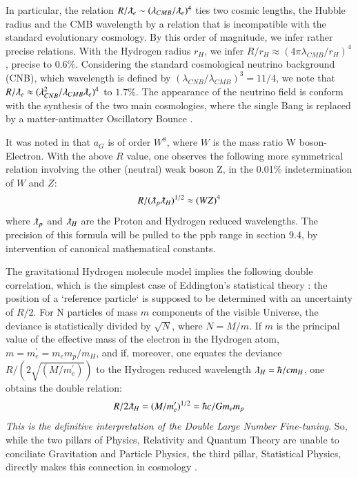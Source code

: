 \documentclass[twoside,draft]{article}
\begin{document}
\begin{sloppypar}
In particular, the relation $R/\lambdabar_{e} \sim (\lambda_{CMB} / \lambdabar_{e})^{4}$ ties two cosmic lengths, the Hubble radius and the CMB wavelength by a relation that is incompatible with the standard evolutionary cosmology. By this order of magnitude, we infer rather precise relations. With the Hydrogen radius $r_H$, we infer 
$ R/r_H \approx (4\pi \lambda_{CMB}/r_H)^{4}$, precise to $0.6\%$. 
Considering the standard cosmological neutrino background (CNB), which wavelength is defined by $(\lambda_{CNB} / \lambda_{CMB})^{3} = 11/4$, we note that $R/ \lambdabar_{e} \approx
( \lambda_{CNB}^{2} / \lambda_{CMB} \lambdabar_{e} )^{4}$ to $1.7\%$. The appearance of the neutrino field is conform with the synthesis of the two main cosmologies, where the single Bang is replaced by a matter-antimatter Oscillatory Bounce \cite{Sanchez2}.

It was noted in \cite{Carr} that $a_{G}$ is of order $W^{8}$, where $W$ is the mass ratio W boson-Electron. With the above $R$ value, one observes the following more symmetrical relation involving the other (neutral) weak boson Z, in the 0.01\% indetermination of $W$ and $Z$:
\begin{equation}
R/(\lambdabar_{p}\lambdabar_{H})^{1/2}\approx (WZ)^4
\end{equation}
where $\lambdabar_{p}$ and $\lambdabar_{H}$ are the Proton and Hydrogen reduced wavelengths. The precision of this formula will be pulled to the ppb range in section 9.4, by intervention of canonical mathematical constants.

The gravitational Hydrogen molecule model \cite{Sanchez1} implies the following double correlation, which is the simplest case of Eddington's statistical theory \cite{Eddington}: the position of a `reference particle` is supposed to be determined 
with an uncertainty of ${R/2}$. 
For N particles of mass $m$ components of the visible Universe, the deviance is statistically divided by $\sqrt{N}$, where $N = M/m$. If $m$ is the principal value of the effective mass of the electron in the Hydrogen atom, $ m = m^{\prime}_{e} = m_{e} m_p/m_H $, and if, moreover, one equates the deviance $R/(2\sqrt{(M/m^{\prime}_{e})})$ to the Hydrogen reduced wavelength $\lambdabar_{H} = \hbar/c m_{H}$, one obtains the double relation:
\begin{equation}
R/2\lambdabar_{H} = (M/m^{\prime}_{e})^{1/2} = \hbar c/G m_{e} m_{p}
\end{equation}
\textit{This is the definitive interpretation of the Double Large Number Fine-tuning}. 
So, while the two pillars of Physics, Relativity and Quantum Theory are unable to conciliate Gravitation 
and Particle Physics, the third pillar, Statistical Physics, directly makes this connection in cosmology \cite{Eddington}.


\end{sloppypar}
\end{document}
